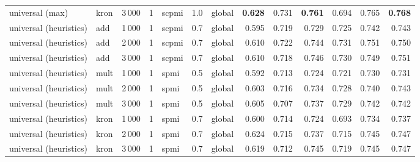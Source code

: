 \begin{tabular}{lllllllrrrrrr}
universal (max)       & kron & 3\,000 & 1 & scpmi & 1.0    & global &        \textbf{0.628} &         0.731 &           \textbf{0.761} &            0.694 &             0.765 &       \textbf{0.768} \\
\addlinespace
universal (heuristics)       & add & 1\,000 & 1  & scpmi & 0.7 & global &        0.595 &         0.719 &           0.729 &            0.725 &             0.742 &       0.743 \\
universal (heuristics)       & add & 2\,000 & 1  & scpmi & 0.7 & global &        0.610 &         0.722 &           0.744 &            0.731 &             0.751 &       0.750 \\
universal (heuristics)       & add & 3\,000 & 1  & scpmi & 0.7 & global &        0.610 &         0.718 &           0.746 &            0.730 &             0.749 &       0.751 \\
\addlinespace
universal (heuristics)       & mult & 1\,000 & 1  & spmi & 0.5 & global &        0.592 &         0.713 &           0.724 &            0.721 &             0.730 &       0.731 \\
universal (heuristics)       & mult & 2\,000 & 1  & spmi & 0.5 & global &        0.603 &         0.716 &           0.734 &            0.728 &             0.740 &       0.743 \\
universal (heuristics)       & mult & 3\,000 & 1  & spmi & 0.5 & global &        0.605 &         0.707 &           0.737 &            0.729 &             0.742 &       0.742 \\
\addlinespace
universal (heuristics)       & kron & 1\,000 & 1  & spmi & 0.7 & global &        0.600 &         0.714 &           0.724 &            0.693 &             0.734 &       0.737 \\
universal (heuristics)       & kron & 2\,000 & 1  & spmi & 0.7 & global &        0.624 &         0.715 &           0.737 &            0.715 &             0.745 &       0.747 \\
universal (heuristics)       & kron & 3\,000 & 1  & spmi & 0.7 & global &        0.619 &         0.712 &           0.745 &            0.719 &             0.745 &       0.747 \\
\bottomrule
\end{tabular}
